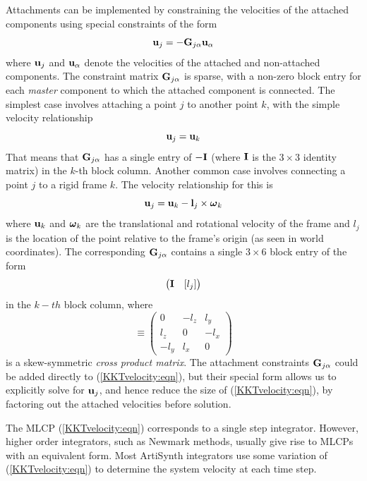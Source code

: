Attachments can be implemented by constraining the velocities of
the attached components using special constraints of the form
%
\begin{equation}
{\bf u}_j = -{\bf G}_{j\alpha} {\bf u}_\alpha
\label{attachments:eqn}
\end{equation}
%
where ${\bf u}_j$ and ${\bf u}_\alpha$ denote the velocities of the attached and
non-attached components. The constraint matrix ${\bf G}_{j\alpha}$ is
sparse, with a non-zero block entry for each {\it master} component to
which the attached component is connected. The simplest case involves
attaching a point $j$ to another point $k$, with the simple velocity relationship
%
\begin{equation}
{\bf u}_j = {\bf u}_k
\end{equation}
%
That means that ${\bf G}_{j\alpha}$ has a single entry of $-{\bf I}$ (where ${\bf I}$
is the $3 \times 3$ identity matrix) in the $k$-th block column.
Another common case involves connecting a point $j$ to
a rigid frame $k$. The velocity relationship for this is
%
\begin{equation}
{\bf u}_j = {\bf u}_k - {\bf l}_j \times \boldsymbol\omega_k
\end{equation}
%
where ${\bf u}_k$ and $\boldsymbol\omega_k$ are the translational and rotational
velocity of the frame and $l_j$ is the location of the point relative
to the frame's origin (as seen in world coordinates). The corresponding
${\bf G}_{j\alpha}$ contains a single $3 \times 6$ block entry of the form
%
\begin{equation}
\left(\begin{matrix}
{\bf I} & [ l_j ]
\end{matrix}\right)
\end{equation}
%
in the $k-th$ block column, where
%
\begin{equation}
[ l ] \equiv 
\left(\begin{matrix}
0 & -l_z & l_y \\
l_z & 0 & -l_x \\
-l_y & l_x & 0
\end{matrix}\right)
\end{equation}
%
is a skew-symmetric {\it cross product matrix}.
The attachment constraints ${\bf G}_{j\alpha}$ 
could be added directly to
(\ref{KKTvelocity:eqn}), but their special form allows us to
explicitly solve for ${\bf u}_j$, and hence reduce the size of
(\ref{KKTvelocity:eqn}), by factoring out the attached velocities
before solution.

The MLCP (\ref{KKTvelocity:eqn}) corresponds to a single step
integrator. However, higher order integrators, such as Newmark
methods, usually give rise to MLCPs with an equivalent form.  Most
ArtiSynth integrators use some variation of (\ref{KKTvelocity:eqn}) to
determine the system velocity at each time step.

